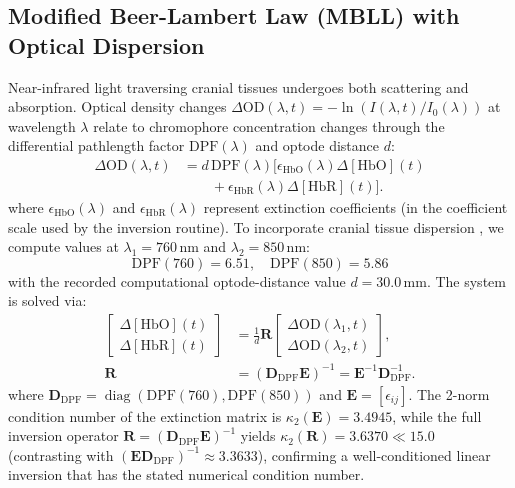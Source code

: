 \documentclass[final,5p,times,twocolumn]{elsarticle}
\begin{document}
\subsection{Modified Beer-Lambert Law (MBLL) with Optical Dispersion}
Near-infrared light traversing cranial tissues undergoes both scattering and absorption. Optical density changes $\Delta \text{OD}(\lambda, t) = -\ln(I(\lambda, t) / I_0(\lambda))$ at wavelength $\lambda$ relate to chromophore concentration changes through the differential pathlength factor $\text{DPF}(\lambda)$ and optode distance $d$:
\begin{equation}
\begin{aligned}
\Delta \text{OD}(\lambda,t)&=d\,\text{DPF}(\lambda)\bigl[\epsilon_{\text{HbO}}(\lambda)\Delta[\text{HbO}](t)\\
&\qquad+\epsilon_{\text{HbR}}(\lambda)\Delta[\text{HbR}](t)\bigr].
\end{aligned}
\end{equation}
where $\epsilon_{\text{HbO}}(\lambda)$ and $\epsilon_{\text{HbR}}(\lambda)$ represent extinction coefficients (in the coefficient scale used by the inversion routine). To incorporate cranial tissue dispersion \cite{duncan1995measurement, scholkmann2013general}, we compute values at $\lambda_1 = 760$\,nm and $\lambda_2 = 850$\,nm:
\begin{equation}
\text{DPF}(760) = 6.51, \quad \text{DPF}(850) = 5.86
\end{equation}
with the recorded computational optode-distance value $d = 30.0$\,mm. The system is solved via:
\begin{equation}
\begin{aligned}
\begin{bmatrix}\Delta[\text{HbO}](t)\\\Delta[\text{HbR}](t)\end{bmatrix}
&=\frac{1}{d}\mathbf{R}\begin{bmatrix}\Delta\text{OD}(\lambda_1,t)\\\Delta\text{OD}(\lambda_2,t)\end{bmatrix},\\
\mathbf{R}&=(\mathbf{D}_{\mathrm{DPF}}\mathbf{E})^{-1}=\mathbf{E}^{-1}\mathbf{D}_{\mathrm{DPF}}^{-1}.
\end{aligned}
\end{equation}
where $\mathbf{D}_{\mathrm{DPF}} = \operatorname{diag}(\text{DPF}(760), \text{DPF}(850))$ and $\mathbf{E} = [\epsilon_{ij}]$. The 2-norm condition number of the extinction matrix is $\kappa_2(\mathbf{E}) = 3.4945$, while the full inversion operator $\mathbf{R} = (\mathbf{D}_{\mathrm{DPF}}\mathbf{E})^{-1}$ yields $\kappa_2(\mathbf{R}) = 3.6370 \ll 15.0$ (contrasting with $(\mathbf{E}\mathbf{D}_{\mathrm{DPF}})^{-1} \approx 3.3633$), confirming a well-conditioned linear inversion that has the stated numerical condition number.
\end{document}
